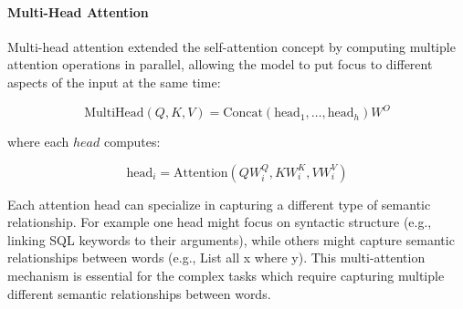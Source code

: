 \paragraph{Multi-Head Attention}

Multi-head attention extended the self-attention concept by computing multiple
attention operations in parallel, allowing the model to put focus to different
aspects of the input at the same time:

\begin{equation}
\text{MultiHead}(Q, K, V) = \text{Concat}(\text{head}_1, \ldots, \text{head}_h)W^O
\end{equation}

where each $head$ computes:

\begin{equation}
\text{head}_i = \text{Attention}(QW_i^Q, KW_i^K, VW_i^V)
\end{equation}

Each attention head can specialize in capturing a different type of semantic
relationship. For example one head might focus on syntactic structure (e.g.,
linking SQL keywords to their arguments), while others might capture semantic
relationships between words (e.g., List all x where y). This multi-attention
mechanism is essential for the complex tasks which require capturing multiple
different semantic relationships between words. 

